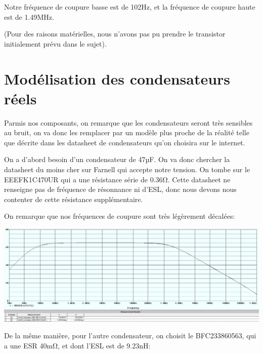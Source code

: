\documentclass{article}
\begin{document}

Notre fréquence de coupure basse est de 102Hz, et la fréquence de coupure haute est de 1.49MHz.

(Pour des raisons matérielles, nous n’avons pas pu prendre le transistor initialement prévu dans le sujet).

\section{Modélisation des condensateurs réels}

Parmis nos composants, on remarque que les condensateurs seront très sensibles au bruit, on va donc les remplacer par un modèle plus proche de la réalité telle que décrite dans les datasheet de condensateurs qu’on choisira sur le internet.

On a d’abord besoin d’un condensateur de 47µF. On va donc chercher la datasheet du moins cher sur Farnell qui accepte notre tension. On tombe sur le EEEFK1C470UR qui a une résistance série de 0.36Ω. Cette datasheet ne renseigne pas de fréquence de résonnance ni d’ESL, donc nous devons nous contenter de cette résistance supplémentaire.

On remarque que nos fréquences de coupure sont très légèrement décalées:

\includegraphics[width=\linewidth]{bode_res_serie_condo.jpg}


De la même manière, pour l’autre condensateur, on choisit le BFC233860563, qui a une ESR 40mΩ, et dont l’ESL est de 9.23nH:
\end{document}

